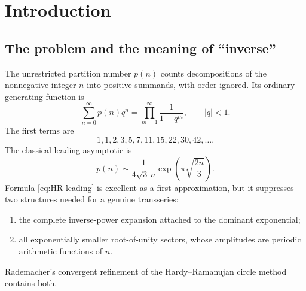 \documentclass[11pt]{article}
\numberwithin{equation}{section}
\theoremstyle{mainthm}
\theoremstyle{defstyle}
\theoremstyle{remark}
\newcommand{\e}{\mathrm e}
\begin{document}
\begin{abstract}
Finally, the inverse of the full Rademacher interpolation is obtained by an exact additive Lagrange--Buermann expansion around \(F^{-1}\).  Every inverse transmonomial has a finite residue formula and an equivalent complete/partial Bell-polynomial formula.  The first correction from sector \((k,\sigma)\) is
\[
 -\frac{3\widetilde A_k(n(\mu))}{\pi^2\sqrt{k}}
 \frac{\mu^2(\mu-\sigma k)}{\mu^2-3\mu+3}
 \e^{-(1-\sigma/k)\mu}.
\]
The positive-sector actions \(1-1/k\) approach \(1\) from below, whereas the negative-sector actions \(1+1/k\) approach it from above.  We show why this accumulation forces a grouped Rademacher resummation at action \(1\), and provide that completion both as the exact convergent Rademacher tail and as a Kloosterman-zeta power series.  The integer generalized inverse is the ceiling of the smooth inverse and therefore contains an unavoidable order-one sawtooth sector.
\end{abstract}

\tableofcontents
\bigskip

\section{Introduction}

\subsection{The problem and the meaning of ``inverse''}

The unrestricted partition number \(p(n)\) counts decompositions of the nonnegative integer \(n\) into positive summands, with order ignored.  Its ordinary generating function is
\begin{equation}\label{eq:euler-product}
 \sum_{n=0}^{\infty}p(n)q^n=\prod_{m=1}^{\infty}\frac1{1-q^m},
 \qquad |q|<1.
\end{equation}
The first terms are
\[
 1,1,2,3,5,7,11,15,22,30,42,\ldots.
\]
The classical leading asymptotic is
\begin{equation}\label{eq:HR-leading}
 p(n)\sim\frac{1}{4\sqrt3\,n}
 \exp\!\left(\pi\sqrt{\frac{2n}{3}}\right).
\end{equation}
Formula \eqref{eq:HR-leading} is excellent as a first approximation, but it suppresses two structures needed for a genuine transseries:
\begin{enumerate}
\item the complete inverse-power expansion attached to the dominant exponential;
\item all exponentially smaller root-of-unity sectors, whose amplitudes are periodic arithmetic functions of \(n\).
\end{enumerate}
Rademacher's convergent refinement of the Hardy--Ramanujan circle method contains both.
\end{document}

